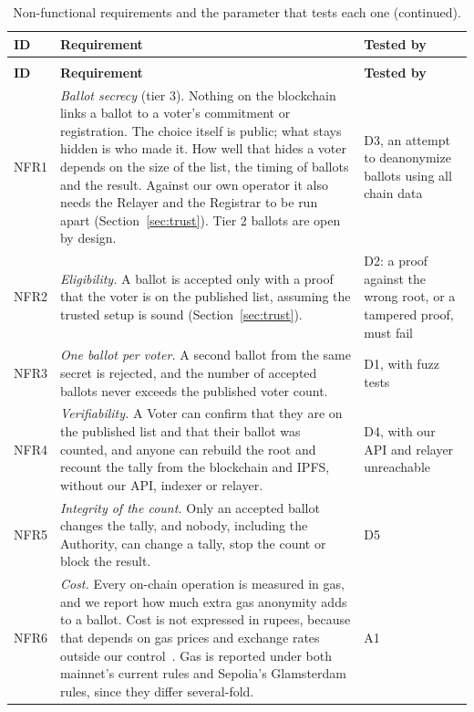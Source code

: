 \begin{longtable}{@{}>{\RaggedRight\arraybackslash\small}p{1.5cm}>{\RaggedRight\arraybackslash\small}p{10.4cm}>{\RaggedRight\arraybackslash\small}p{5.4cm}@{}}
  \caption{Non-functional requirements and the parameter that tests each one.}\label{tab:nfr}\\
  \toprule
  \textbf{ID} & \textbf{Requirement} & \textbf{Tested by} \\
  \midrule
  \endfirsthead
  \caption[]{Non-functional requirements and the parameter that tests each one (continued).}\\
  \toprule
  \textbf{ID} & \textbf{Requirement} & \textbf{Tested by} \\
  \midrule
  \endhead
  \bottomrule
  \endlastfoot
  NFR1 & \emph{Ballot secrecy} (tier 3). Nothing on the blockchain links a ballot to a voter's commitment or registration. The choice itself is public; what stays hidden is who made it. How well that hides a voter depends on the size of the list, the timing of ballots and the result. Against our own operator it also needs the Relayer and the Registrar to be run apart (Section~\ref{sec:trust}). Tier 2 ballots are open by design. & D3, an attempt to deanonymize ballots using all chain data \\
  \addlinespace[2pt]
  NFR2 & \emph{Eligibility.} A ballot is accepted only with a proof that the voter is on the published list, assuming the trusted setup is sound (Section~\ref{sec:trust}). & D2: a proof against the wrong root, or a tampered proof, must fail \\
  \addlinespace[2pt]
  NFR3 & \emph{One ballot per voter.} A second ballot from the same secret is rejected, and the number of accepted ballots never exceeds the published voter count. & D1, with fuzz tests \\
  \addlinespace[2pt]
  NFR4 & \emph{Verifiability.} A Voter can confirm that they are on the published list and that their ballot was counted, and anyone can rebuild the root and recount the tally from the blockchain and IPFS, without our API, indexer or relayer. & D4, with our API and relayer unreachable \\
  \addlinespace[2pt]
  NFR5 & \emph{Integrity of the count.} Only an accepted ballot changes the tally, and nobody, including the Authority, can change a tally, stop the count or block the result. & D5 \\
  \addlinespace[2pt]
  NFR6 & \emph{Cost.} Every on-chain operation is measured in gas, and we report how much extra gas anonymity adds to a ballot. Cost is not expressed in rupees, because that depends on gas prices and exchange rates outside our control~\cite{ethgas}. Gas is reported under both mainnet's current rules and Sepolia's Glamsterdam rules, since they differ several-fold. & A1 \\

\end{longtable}
